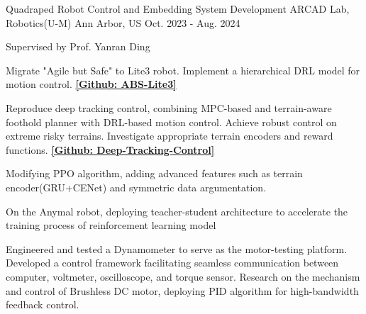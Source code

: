 


  \begin{cventry}
    {Quadraped Robot Control and Embedding System Development}
    {ARCAD Lab, Robotics(U-M)}
    {Ann Arbor, US}
    {Oct. 2023 - Aug. 2024}
    {
      \begin{cvitems}
        \item {Supervised by Prof. Yanran Ding}
        \item {Migrate "Agile but Safe" to Lite3 robot. Implement a hierarchical DRL model for motion control. \href{https://github.com/priest-yang/ABS-DeepRobotics-Lite3}{\textbf{[Github: ABS-Lite3]}}}
        \item {Reproduce deep tracking control, combining MPC-based and terrain-aware foothold planner with DRL-based motion control. Achieve robust control on extreme risky terrains. Investigate appropriate terrain encoders and reward functions. \href{https://github.com/priest-yang/Deep-Tracking-Control}{\textbf{[Github: Deep-Tracking-Control]}}}
        \item {Modifying PPO algorithm, adding advanced features such as terrain encoder(GRU+CENet) and symmetric data argumentation.}
        \item {On the Anymal robot, deploying teacher-student architecture to accelerate the training process of reinforcement learning model}
        \item {Engineered and tested a Dynamometer to serve as the motor-testing platform. Developed a control framework facilitating seamless communication between computer, voltmeter, oscilloscope, and torque sensor. Research on the mechanism and control of Brushless DC motor, deploying PID algorithm for high-bandwidth feedback control.}
      \end{cvitems}
    }
  
  \end{cventry}

